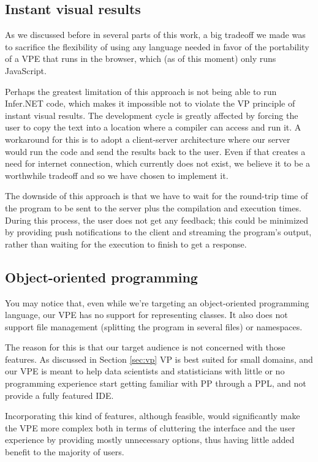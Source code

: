 \subsection{Instant visual results}

As we discussed before in several parts of this work, a big tradeoff we made was
to sacrifice the flexibility of using any language needed in favor of the portability
of a VPE that runs in the browser, which (as of this moment) only runs JavaScript.

Perhaps the greatest limitation of this approach is not being able to run Infer.NET
code, which makes it impossible not to violate the VP principle of instant visual results.
The development cycle is greatly affected by forcing the user to copy the text
into a location where a compiler can access and run it. A workaround for this
is to adopt a client-server architecture where our server would run the code
and send the results back to the user. Even if that creates a need for internet
connection, which currently does not exist, we believe it to be a worthwhile tradeoff
and so we have chosen to implement it.

The downside of this approach is that we have to wait for the round-trip time
of the program to be sent to the server plus the compilation and execution times.
During this process, the user does not get any feedback; this could be minimized
by providing push notifications to the client and streaming the program's output,
rather than waiting for the execution to finish to get a response.

\subsection{Object-oriented programming}

You may notice that, even while we're targeting an object-oriented programming
language, our VPE has no support for representing classes. It also does not
support file management (splitting the program in several files) or namespaces.

The reason for this is that our target audience is not concerned with those features.
As discussed in Section \ref{sec:vp} VP is best suited for small domains, and our
VPE is meant to help data scientists and statisticians with little or no programming
experience start getting familiar with PP through a PPL, and not provide a
fully featured IDE.

Incorporating this kind of features, although feasible, would significantly
make the VPE more complex both in terms of cluttering the interface and the user
experience by providing mostly unnecessary options, thus having little added
benefit to the majority of users.

